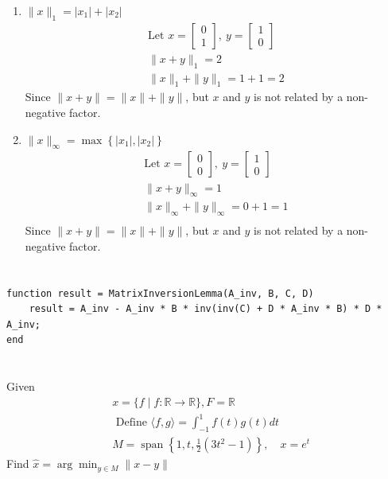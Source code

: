 \documentclass{article}
\theoremstyle{definition} %
\begin{document}
\begin{enumerate}[label=(\alph*)]
    \item $\|x\|_1=\left|x_1\right|+\left|x_2\right|$
        \begin{align*}
            \text{Let } x=\left[\begin{array}{l}
            0 \\
            1
            \end{array}\right],\ y=\left[\begin{array}{l}
            1 \\
            0
            \end{array}\right] \\
            \|x+y\|_1=2 \\
            \|x\|_1+\|y\|_1=1+1=2
        \end{align*}
        Since $\|x+y\|=\|x\|+\|y\|$, but $x$ and $y$ is not related by a non-negative factor.
    \item $\|x\|_{\infty}=\max \left\{\left|x_1\right|,\left|x_2\right|\right\}$
        \begin{align*}
            \text{Let } x=\left[\begin{array}{l}0 \\ 0\end{array}\right],\ y=\left[\begin{array}{l}1 \\ 0\end{array}\right]\\
            \|x+y\|_{\infty}=1\\
            \|x\|_{\infty}+\|y\|_{\infty}=0+1=1\\
        \end{align*}
        Since $\|x+y\|=\|x\|+\|y\|$, but $x$ and $y$ is not related by a non-negative factor.
\end{enumerate}


\section{}
\begin{lstlisting}
function result = MatrixInversionLemma(A_inv, B, C, D)
    result = A_inv - A_inv * B * inv(inv(C) + D * A_inv * B) * D * A_inv;
end
\end{lstlisting}



\section{}
Given 
$$
\begin{aligned}
&x=\{f \mid f: \mathbb{R} \rightarrow \mathbb{R}\}, F=\mathbb{R} \\
&\text { Define }\langle f, g\rangle=\int_{-1}^1 f(t) g(t) d t \\
&M=\operatorname{span}\left\{1, t, \frac{1}{2}\left(3 t^2-1\right)\right\}, \quad x=e^t
\end{aligned}
$$
Find $\hat{x}=\arg \min_{y\in M} \|x-y\|$
\end{document}
